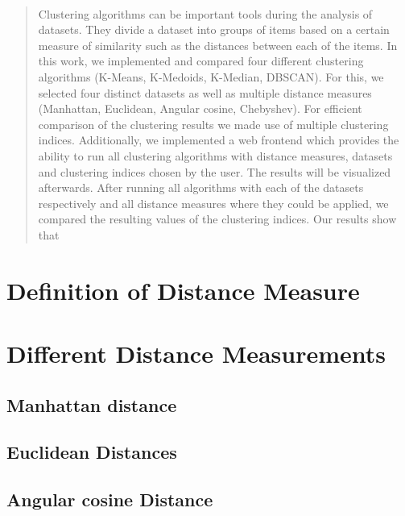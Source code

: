 \documentclass[12pt, english]
{article}
\begin{document}
\newpage\thispagestyle{empty}~ %
\newpage 

\begin{abstract}
Clustering algorithms can be important tools during the analysis of datasets. They divide a dataset into groups of items based on a certain measure of similarity such as the distances between each of the items. 
In this work, we implemented and compared four different clustering algorithms (K-Means, K-Medoids, K-Median, DBSCAN). For this, we selected four distinct datasets as well as multiple distance measures (Manhattan, Euclidean, Angular cosine, Chebyshev). For efficient comparison of the clustering results we made use of multiple clustering indices. Additionally, we implemented a web frontend which provides the ability to run all clustering algorithms with distance measures, datasets and clustering indices chosen by the user. The results will be visualized afterwards.
After running all algorithms with each of the datasets respectively and all distance measures where they could be applied, we compared the resulting values of the clustering indices.
Our results show that

\end{abstract}

\newpage

\tableofcontents

\newpage


\section{Definition of Distance Measure}
\label{def_DM}

\section{Different Distance Measurements} \label{distances}
\subsection{Manhattan distance}

\subsection{Euclidean Distances}


\subsection{Angular cosine Distance}

\end{document}
